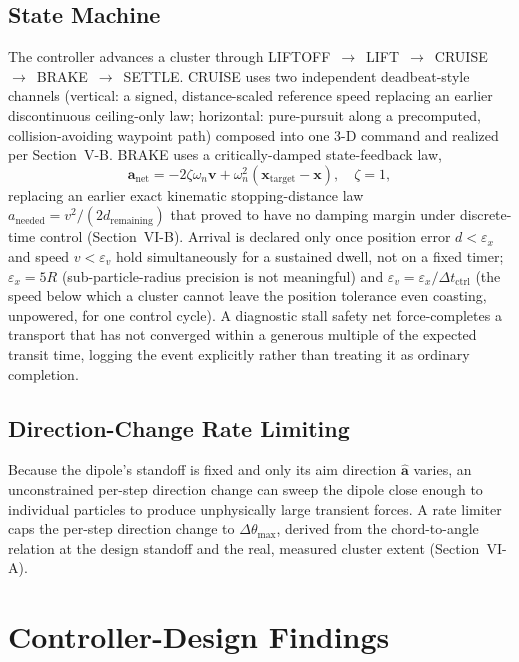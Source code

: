 \documentclass[journal]{IEEEtran}
\begin{document}
\subsection{State Machine}
The controller advances a cluster through
LIFTOFF~$\rightarrow$~LIFT~$\rightarrow$~CRUISE~$\rightarrow$~BRAKE~$\rightarrow$~SETTLE.
CRUISE uses two independent deadbeat-style channels (vertical: a
signed, distance-scaled reference speed replacing an earlier discontinuous
ceiling-only law; horizontal: pure-pursuit along a precomputed,
collision-avoiding waypoint path) composed into one 3-D command and
realized per Section~V-B. BRAKE uses a critically-damped state-feedback
law,
\begin{equation}
\mathbf{a}_{\mathrm{net}} = -2\zeta\omega_n\mathbf{v}
+ \omega_n^2(\mathbf{x}_{\mathrm{target}}-\mathbf{x}),
\quad \zeta=1,
\label{eq:brake}
\end{equation}
replacing an earlier exact kinematic stopping-distance law
$a_{\mathrm{needed}}=v^2/(2d_{\mathrm{remaining}})$ that proved to have no
damping margin under discrete-time control (Section~VI-B). Arrival is
declared only once position error $d<\varepsilon_x$ and speed
$v<\varepsilon_v$ hold simultaneously for a sustained dwell, not on a fixed
timer; $\varepsilon_x=5R$ (sub-particle-radius precision is not
meaningful) and $\varepsilon_v=\varepsilon_x/\Delta t_{\mathrm{ctrl}}$ (the
speed below which a cluster cannot leave the position tolerance even
coasting, unpowered, for one control cycle). A diagnostic stall safety net
force-completes a transport that has not converged within a generous
multiple of the expected transit time, logging the event explicitly rather
than treating it as ordinary completion.

\subsection{Direction-Change Rate Limiting}
Because the dipole's standoff is fixed and only its aim direction
$\hat{\mathbf{a}}$ varies, an unconstrained per-step direction change can
sweep the dipole close enough to individual particles to produce
unphysically large transient forces. A rate limiter caps the per-step
direction change to $\Delta\theta_{\max}$, derived from the chord-to-angle
relation at the design standoff and the real, measured cluster extent
(Section~VI-A).

\section{Controller-Design Findings}
\end{document}
